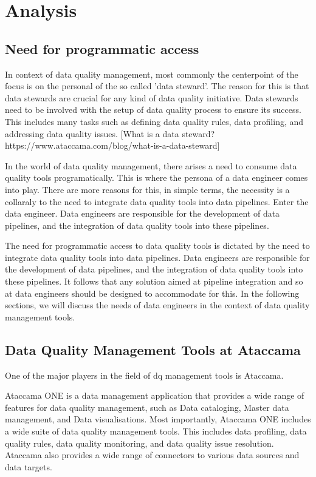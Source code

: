 \chapter{Analysis}


\section{Need for programmatic access}

In context of data quality management, most commonly the centerpoint of the focus is on the personal of the so called 'data steward'. The reason for this is that data stewards are crucial
for any kind of data quality initiative. Data stewards need to be involved with the setup of data quality process to ensure its success. This includes many tasks such as defining data quality rules,
data profiling, and addressing data quality issues. [What is a data steward? https://www.ataccama.com/blog/what-is-a-data-steward]

In the world of data quality management, there arises a need to consume data quality tools programatically. This is where the persona of a data engineer comes into play. There are more reasons for this, in simple terms,
the necessity is a collaraly to the need to integrate data quality tools into data pipelines. Enter the data engineer. Data engineers are responsible for the development of data pipelines, and the integration of data quality tools into these pipelines. 

The need for programmatic access to data quality tools is dictated by the need to integrate data quality tools into data pipelines. Data engineers are responsible for the development of data pipelines, and the integration of data quality tools into these pipelines. It follows that any solution aimed at pipeline integration and so at data engineers should be designed to accommodate for this. In the following sections, we will discuss the needs of data engineers in the context of data quality management tools.

\section{Data Quality Management Tools at Ataccama}

One of the major players in the field of dq management tools is Ataccama. 

Ataccama ONE is a data management application that provides a wide range of features for data quality management, such as Data cataloging, Master data management, and Data visualisations. Most importantly, Ataccama ONE includes a wide suite of data quality management tools. This includes data profiling, data quality rules, data quality monitoring, and data quality issue resolution. Ataccama also provides a wide range of connectors to various data sources and data targets.


